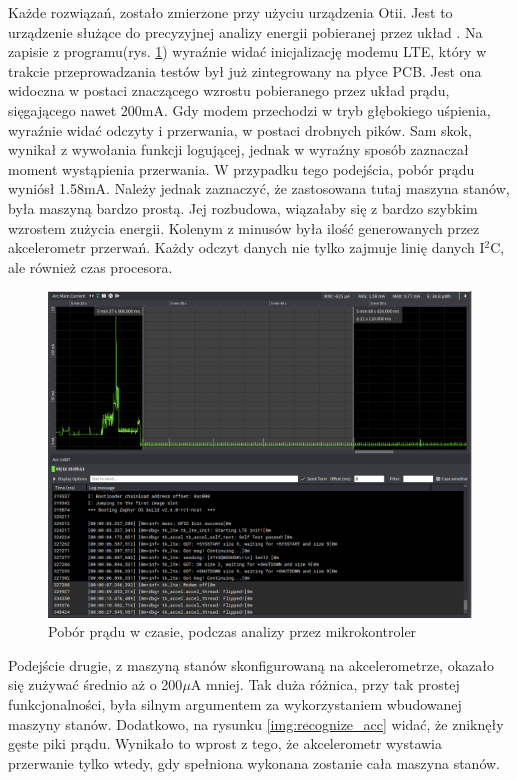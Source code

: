 Każde rozwiązań, zostało zmierzone przy użyciu urządzenia Otii. Jest to urządzenie służące do precyzyjnej analizy energii pobieranej przez układ \cite{otii}. Na zapisie z programu(rys. \ref{img:recognize_mcu}) wyraźnie widać inicjalizację modemu LTE, który w trakcie przeprowadzania testów był już zintegrowany na płyce PCB. Jest ona widoczna w postaci znaczącego wzrostu pobieranego przez układ prądu, sięgającego nawet 200mA. Gdy modem przechodzi w tryb głębokiego uśpienia, wyraźnie widać odczyty i przerwania, w postaci drobnych pików. Sam skok, wynikał z wywołania funkcji logującej, jednak w wyraźny sposób zaznaczał moment wystąpienia przerwania. W przypadku tego podejścia, pobór prądu wyniósł 1.58mA. Należy jednak zaznaczyć, że zastosowana tutaj maszyna stanów, była maszyną bardzo prostą. Jej rozbudowa, wiązałaby się z bardzo szybkim wzrostem zużycia energii. Kolenym z minusów była ilość generowanych przez akcelerometr przerwań. Każdy odczyt danych nie tylko zajmuje linię danych I$^{2}$C, ale również czas procesora. 
\begin{figure}[h]
    \centering
    \includegraphics[width=15cm]{Graphics/recognize_mcu.png}
    \caption{Pobór prądu w czasie, podczas analizy przez mikrokontroler}
    \label{img:recognize_mcu}
\end{figure}
\newline
Podejście drugie, z maszyną stanów skonfigurowaną na akcelerometrze, okazało się zużywać średnio aż o 200$\mu$A mniej. Tak duża różnica, przy tak prostej funkcjonalności, była silnym argumentem za wykorzystaniem wbudowanej maszyny stanów. Dodatkowo, na rysunku \ref{img:recognize_acc} widać, że zniknęły gęste piki prądu. Wynikało to wprost z tego, że akcelerometr wystawia przerwanie tylko wtedy, gdy spełniona wykonana zostanie cała maszyna stanów.
